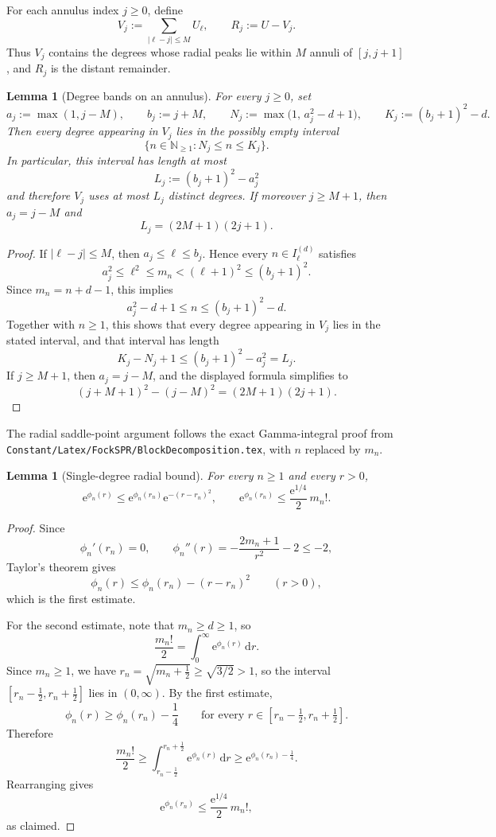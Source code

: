 \documentclass[11pt]{amsart}
\newtheorem{lemma}[theorem]{Lemma}
\theoremstyle{remark}
\newcommand{\N}{\mathbb{N}}
\newcommand{\abs}[1]{\lvert #1 \rvert}
\newcommand{\dd}{\mathrm{d}}
\newcommand{\ee}{\mathrm{e}}
\begin{document}
For each annulus index $j \ge 0$, define
\[
V_j := \sum_{\abs{\ell-j}\le M} U_\ell,
\qquad
R_j := U - V_j.
\]
Thus $V_j$ contains the degrees whose radial peaks lie within $M$ annuli of
$[j,j+1]$, and $R_j$ is the distant remainder.

\begin{lemma}[Degree bands on an annulus]\label{lem:count}
For every $j \ge 0$, set
\[
a_j := \max(1,j-M),
\qquad
b_j := j+M,
\qquad
N_j := \max\bigl(1,\,a_j^2 - d + 1\bigr),
\qquad
K_j := (b_j+1)^2 - d.
\]
Then every degree appearing in $V_j$ lies in the possibly empty interval
\[
\bigl\{
n \in \N_{\ge 1} : N_j \le n \le K_j
\bigr\}.
\]
In particular, this interval has length at most
\[
L_j := (b_j+1)^2 - a_j^2
\]
and therefore $V_j$ uses at most $L_j$ distinct degrees.
If moreover $j \ge M+1$, then $a_j = j-M$ and
\[
L_j = (2M+1)(2j+1).
\]
\end{lemma}

\begin{proof}
If $\abs{\ell-j}\le M$, then $a_j \le \ell \le b_j$.  Hence every
$n \in I_\ell^{(d)}$ satisfies
\[
a_j^2 \le \ell^2 \le m_n < (\ell+1)^2 \le (b_j+1)^2.
\]
Since $m_n = n+d-1$, this implies
\[
a_j^2-d+1 \le n \le (b_j+1)^2-d.
\]
Together with $n \ge 1$, this shows that every degree appearing in $V_j$
lies in the stated interval, and that interval has length
\[
K_j-N_j+1 \le (b_j+1)^2-a_j^2 = L_j.
\]
If $j \ge M+1$, then $a_j = j-M$, and the displayed formula simplifies to
\[
(j+M+1)^2-(j-M)^2 = (2M+1)(2j+1).
\]
\end{proof}

The radial saddle-point argument follows the exact Gamma-integral proof from
\texttt{Constant/Latex/FockSPR/BlockDecomposition.tex}, with $n$ replaced by
$m_n$.

\begin{lemma}[Single-degree radial bound]\label{lem:single-degree}
For every $n \ge 1$ and every $r > 0$,
\[
\ee^{\phi_n(r)}
\le
\ee^{\phi_n(r_n)} \ee^{-(r-r_n)^2},
\qquad
\ee^{\phi_n(r_n)}
\le
\frac{\ee^{1/4}}{2}\, m_n!.
\]
\end{lemma}

\begin{proof}
Since
\[
\phi_n'(r_n)=0,
\qquad
\phi_n''(r)
=
-\frac{2m_n+1}{r^2}-2
\le
-2,
\]
Taylor's theorem gives
\[
\phi_n(r)
\le
\phi_n(r_n)-(r-r_n)^2
\qquad (r>0),
\]
which is the first estimate.

For the second estimate, note that $m_n \ge d \ge 1$, so
\[
\frac{m_n!}{2}
=
\int_0^\infty \ee^{\phi_n(r)}\,\dd r.
\]
Since $m_n \ge 1$, we have $r_n = \sqrt{m_n+\tfrac12} \ge \sqrt{3/2} > 1$,
so the interval $[r_n-\tfrac12,r_n+\tfrac12]$ lies in $(0,\infty)$.  By the
first estimate,
\[
\phi_n(r) \ge \phi_n(r_n)-\frac14
\qquad
\text{for every } r \in [r_n-\tfrac12,r_n+\tfrac12].
\]
Therefore
\[
\frac{m_n!}{2}
\ge
\int_{r_n-\frac12}^{r_n+\frac12} \ee^{\phi_n(r)}\,\dd r
\ge
\ee^{\phi_n(r_n)-\frac14}.
\]
Rearranging gives
\[
\ee^{\phi_n(r_n)}
\le
\frac{\ee^{1/4}}{2}\,m_n!,
\]
as claimed.
\end{proof}
\end{document}
